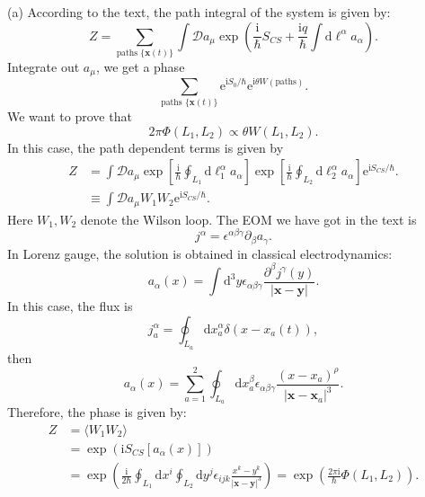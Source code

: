 \documentclass{book}
\begin{document}
(a) According to the text, the path integral of the system is given by:
\begin{equation*}
Z=\sum _{\text{paths }\{\boldsymbol{x}( t)\}}\int \mathcal{D} a_{\mu }\exp\left(\frac{\mathrm{i}}{\hbar } S_{CS} +\frac{\mathrm{i} q}{\hbar }\int \mathrm{d} \ell ^{\alpha } a_{\alpha }\right) .
\end{equation*}
Integrate out $a_{\mu }$, we get a phase
\begin{equation*}
\sum _{\text{paths }\{\boldsymbol{x}( t)\}}\mathrm{e}^{\mathrm{i} S_{0} /\hbar }\mathrm{e}^{\mathrm{i} \theta W(\text{paths} )} .
\end{equation*}
We want to prove that
\begin{equation*}
2\pi \Phi ( L_{1} ,L_{2}) \varpropto \theta W( L_{1} ,L_{2}) .
\end{equation*}
In this case, the path dependent terms is given by
\begin{equation*}
\begin{aligned}
Z & =\int \mathcal{D} a_{\mu }\exp\left[\frac{\mathrm{i}}{\hbar }\oint _{L_{1}}\mathrm{d} \ell _{1}^{\alpha } a_{\alpha }\right]\exp\left[\frac{\mathrm{i}}{\hbar }\oint _{L_{2}}\mathrm{d} \ell _{2}^{\alpha } a_{\alpha }\right]\mathrm{e}^{\mathrm{i} S_{CS} /\hbar } .\\
 & \equiv \int \mathcal{D} a_{\mu } W_{1} W_{2}\mathrm{e}^{\mathrm{i} S_{CS} /\hbar } .
\end{aligned}
\end{equation*}
Here $W_{1} ,W_{2}$ denote the Wilson loop. The EOM we have got in the text is
\begin{equation*}
j^{\alpha } =\epsilon ^{\alpha \beta \gamma } \partial _{\beta } a_{\gamma } .
\end{equation*}
In Lorenz gauge, the solution is obtained in classical electrodynamics:
\begin{equation*}
a_{\alpha }( x) =\int \mathrm{d}^{3} y\epsilon _{\alpha \beta \gamma }\frac{\partial ^{\beta } j^{\gamma }( y)}{| \boldsymbol{x} -\boldsymbol{y}| } .
\end{equation*}
In this case, the flux is
\begin{equation*}
j_{a}^{\alpha } =\oint _{L_{a}}\mathrm{d} x_{a}^{\alpha } \delta (x-x_{a}( t) ),
\end{equation*}
then
\begin{equation*}
a_{\alpha }( x) =\sum _{a=1}^{2}\oint _{L_{a}}\mathrm{d} x_{a}^{\beta } \epsilon _{\alpha \beta \gamma }\frac{(x-x_{a} )^{\rho }}{| \boldsymbol{x} -\boldsymbol{x}_{a}| ^{3}} .
\end{equation*}
Therefore, the phase is given by:
\begin{equation*}
\begin{aligned}
Z & =\langle W_{1} W_{2} \rangle \\
 & =\exp(\mathrm{i} S_{CS}[ a_{\alpha }( x)])\\
 & =\exp\left(\frac{\mathrm{i}}{2\hbar }\oint _{L_{1}}\mathrm{d} x^{i}\oint _{L_{2}}\mathrm{d} y^{j} \epsilon _{ijk}\frac{x^{k} -y^{k}}{|\boldsymbol{x} -\boldsymbol{y} |^{3}}\right) =\exp\left(\frac{2\pi \mathrm{i}}{\hbar } \Phi ( L_{1} ,L_{2})\right) .
\end{aligned}
\end{equation*}
\end{document}
